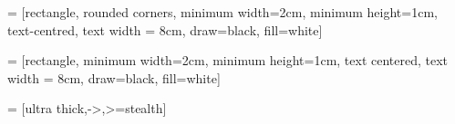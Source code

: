 \usepackage{indentfirst}
\usepackage{amsmath, amsthm, amssymb, amsfonts} %
\usepackage{graphicx} %
\usepackage{float} %
\usepackage{caption} %
\usepackage{subcaption} %
\usepackage{xcolor} %
\usepackage{hyperref} %
\usepackage{fancyhdr} %
\usepackage[margin = 2.5cm]{geometry} %
\usepackage{fancyhdr} %
\usepackage{mathtools} %
\usepackage{fancyhdr} %

\usepackage{tikz} %
\usetikzlibrary{positioning} %
\usetikzlibrary{calc} %
\usetikzlibrary{shapes.geometric, arrows}

 = [rectangle, rounded corners, minimum width=2cm, minimum height=1cm, text-centred, text width = 8cm, draw=black, fill=white]


 = [rectangle, minimum width=2cm, minimum height=1cm, text centered, text width = 8cm, draw=black, fill=white]


 = [ultra thick,->,>=stealth]
\usepackage{listings}
\usepackage{xcolor}

